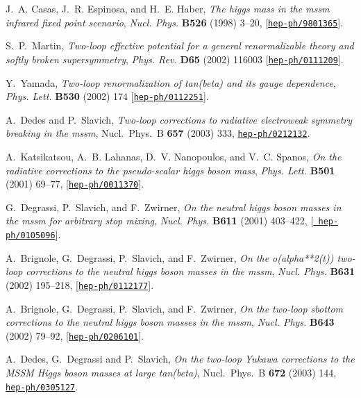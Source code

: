 \documentclass{article}
\begin{document}
\begin{thebibliography}{10}
J.~A. Casas, J.~R. Espinosa, and H.~E. Haber, {\it The higgs mass in the mssm
  infrared fixed point scenario},  {\em Nucl. Phys.} {\bf B526} (1998) 3--20,
  [\href{http://xxx.lanl.gov/abs/hep-ph/9801365}{{\tt hep-ph/9801365}}].

  S.~P.~Martin,
  {\em Two-loop effective potential for a general renormalizable theory and
  softly broken supersymmetry},
  {\em Phys. Rev.}   {\bf D65} (2002) 116003
  [\href{http://xxx.lanl.gov/abs/hep-ph/0111209}{{\tt hep-ph/0111209}}].

  Y.~Yamada,
  {\em Two-loop renormalization of tan(beta) and its gauge dependence},
  {\em Phys. Lett.}   {\bf B530} (2002) 174
  [\href{http://xxx.lanl.gov/abs/hep-ph/0112251}{{\tt hep-ph/0112251}}].

A.~Dedes and P.~Slavich, {\it Two-loop corrections to radiative electroweak
  symmetry breaking in the mssm}, Nucl.\ Phys.\ B {\bf 657} (2003) 333,
  \href{http://xxx.lanl.gov/abs/hep-ph/0212132}{{\tt hep-ph/0212132}}.

A.~Katsikatsou, A.~B. Lahanas, D.~V. Nanopoulos, and V.~C. Spanos, {\it On the
  radiative corrections to the pseudo-scalar higgs boson mass},  {\em Phys.
  Lett.} {\bf B501} (2001) 69--77,
  [\href{http://xxx.lanl.gov/abs/hep-ph/0011370}{{\tt hep-ph/0011370}}].

G.~Degrassi, P.~Slavich, and F.~Zwirner, {\it On the neutral higgs boson masses
  in the mssm for arbitrary stop mixing},  {\em Nucl. Phys.} {\bf B611} (2001)
  403--422, [\href{http://xxx.lanl.gov/abs/hep-ph/0105096}{{\tt
  hep-ph/0105096}}].

A.~Brignole, G.~Degrassi, P.~Slavich, and F.~Zwirner, {\it On the
  o(alpha**2(t)) two-loop corrections to the neutral higgs boson masses in the
  mssm},  {\em Nucl. Phys.} {\bf B631} (2002) 195--218,
  [\href{http://xxx.lanl.gov/abs/hep-ph/0112177}{{\tt hep-ph/0112177}}].

A.~Brignole, G.~Degrassi, P.~Slavich, and F.~Zwirner, {\it On the two-loop
  sbottom corrections to the neutral higgs boson masses in the mssm},  {\em
  Nucl. Phys.} {\bf B643} (2002) 79--92,
  [\href{http://xxx.lanl.gov/abs/hep-ph/0206101}{{\tt hep-ph/0206101}}].

A.~Dedes, G.~Degrassi and P.~Slavich,
{\it On the two-loop Yukawa corrections to the MSSM Higgs boson masses at
  large tan(beta)},   Nucl.\ Phys.\ B {\bf 672} (2003) 144,
  \href{http://xxx.lanl.gov/abs/hep-ph/0305127}{{\tt hep-ph/0305127}}.


\end{thebibliography}
\end{document}
